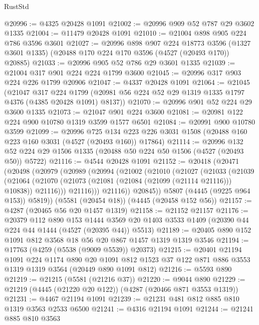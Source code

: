 \begin{lexlean}{RustStd}
\begin{coremodule}
@20996 := @4325 @20428 @1091
@21002 := @20996 @909 @52 @787 @29 @3602 @1335
@21004 := @11479 @20428 @1091
@21010 := @21004 @898 @905 @224 @786 @3596 @3601
@21027 := @20996
    @898
    @907
    @224
    @18773
    @3596
    (@1327 @3601 @1335)
    (@20488 @170 @224 @170 @3596 (@4527 (@20493 @170)) @20885)
@21033 := @20996 @905 @52 @786 @29 @3601 @1335
@21039 := @21004 @317 @901 @224 @224 @1799 @3600
@21045 := @20996 @317 @903 @224 @226 @1799 @20906
@21047 := @4337 @20428 @1091
@21064 := @21045
    (@21047
      @317
      @224
      @1799
      (@20981 @56 @224 @52 @29 @1319 @1335 @1797 @4376 (@4385 @20428 @1091) @8137))
@21070 := @20996 @901 @52 @224 @29 @3600 @1335
@21073 := @21047 @901 @224 @3600
@21081 := @20981 @122 @224 @900 @10780 @1319 @3599 @1577 @6501
@21084 := @20991 @900 @10780 @3599
@21099 := @20996
    @725
    @134
    @223
    @226
    @3031
    @1508
    (@20488 @160 @223 @160 @3031 (@4527 (@20493 @160)) @17864)
@21114 := @20996
    @132
    @52
    @224
    @29
    @1506
    @1335
    (@20488 @50 @224 @50 @1506 (@4527 (@20493 @50)) @5722)
@21116 := @4544 @20428 @1091
@21152 := @20418
    (@20471
      (@20498
        (@20979
          (@20989
            (@20994
              (@21002
                (@21010
                  (@21027
                    (@21033
                      (@21039
                        (@21064
                          (@21070
                            (@21073 (@21081 (@21084 (@21099 (@21114 @21116))) @10838))
                            @21116)))
                      @21116)))
                @21116))
            @20845))
        @5807
        (@4445 (@9225 @964 @153))
        @5819))
    (@5581 (@20454 @18))
    (@4445 (@20458 @152 @56))
@21157 := @4287 (@20465 @56 @20 @1457 @1319)
@21158 := @21152 @21157
@21176 := @20379
    @112
    @890
    @153
    @1444
    @3569
    @20
    @1403
    @3533
    @1409
    (@20390 @44 @224 @44 @1444 (@4527 (@20395 @44)) @5513)
@21189 := @20405 @890 @152 @1091 @812 @3568 @18 @56 @20 @867 @1457 @1319 @1319 @3546
@21194 := @17763 (@4259 (@5538 (@9009 @5539)) @20373)
@21215 := @20401
    @21194
    @1091
    @224
    @1174
    @890
    @20
    @1091
    @812
    @1523
    @37
    @122
    @871
    @886
    @3553
    @1319
    @1319
    @3564
    (@20449 @890 @1091 @812)
@21216 := @5593 @890
@21219 := @21215 (@5581 (@21216 @37))
@21220 := @9044 @890
@21229 := @21219 (@4445 (@21220 @20 @122)) (@4287 (@20466 @871 @3553 @1319))
@21231 := @4467 @21194 @1091
@21239 := @21231 @481 @812 @885 @810 @1319 @3563 @2533 @6500
@21241 := @4316 @21194 @1091
@21244 := @21241 @885 @810 @3563

\end{coremodule}
\end{lexlean}
